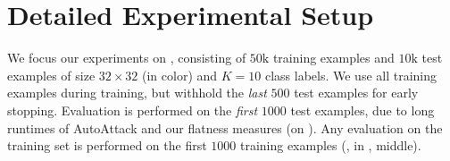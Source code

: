 \section{Detailed Experimental Setup}
\label{sec:supp-setup}

We focus our experiments on \CifarT \cite{Krizhevsky2009}, consisting of $50\text{k}$ training examples and $10\text{k}$ test examples of size $32\times32$ (in color) and $K = 10$ class labels. We use all training examples during training, but withhold the \emph{last} $500$ test examples for early stopping. Evaluation is performed on the \emph{first} $1000$ test examples, due to long runtimes of AutoAttack \cite{CroceARXIV2020} and our flatness measures (on \RCE). Any evaluation on the training set is performed on the first $1000$ training examples (\eg, in , middle).

